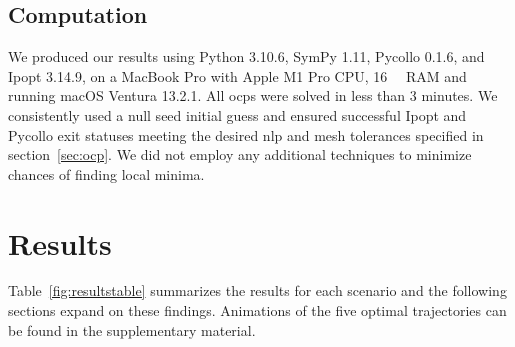 \documentclass[default,iicol,pdflatex]{sn-jnl}
\begin{document}
\subsection{Computation}
We produced our results using Python 3.10.6, SymPy 1.11, Pycollo 0.1.6, and Ipopt 3.14.9, on a MacBook Pro with Apple M1 Pro CPU, \SI{16}{\giga\byte} RAM and running macOS Ventura 13.2.1.
All \glspl{ocp} were solved in less than 3 minutes.
We consistently used a null seed initial guess and ensured successful Ipopt and Pycollo exit statuses meeting the desired \gls{nlp} and mesh tolerances specified in section~\ref{sec:ocp}. We did not employ any additional techniques to minimize chances of finding local minima.


\section{Results}
%
Table~\ref{fig:resultstable} summarizes the results for each scenario and the following sections expand on these findings. Animations of the five optimal trajectories can be found in the supplementary material.
%
\end{document}
